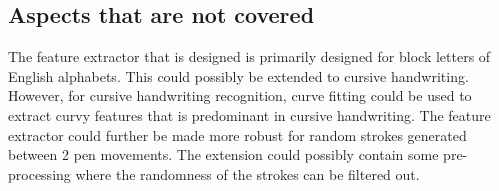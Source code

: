 \subsection{Aspects that are not covered}
The feature extractor that is designed is primarily designed for block letters of English alphabets. This could possibly be extended to cursive handwriting. However, for cursive handwriting recognition, curve fitting could be used to extract curvy features that is predominant in cursive handwriting.  The feature extractor could further be made more robust for random strokes generated between 2 pen movements. The extension could possibly contain some pre-processing where the randomness of the strokes can be filtered out.